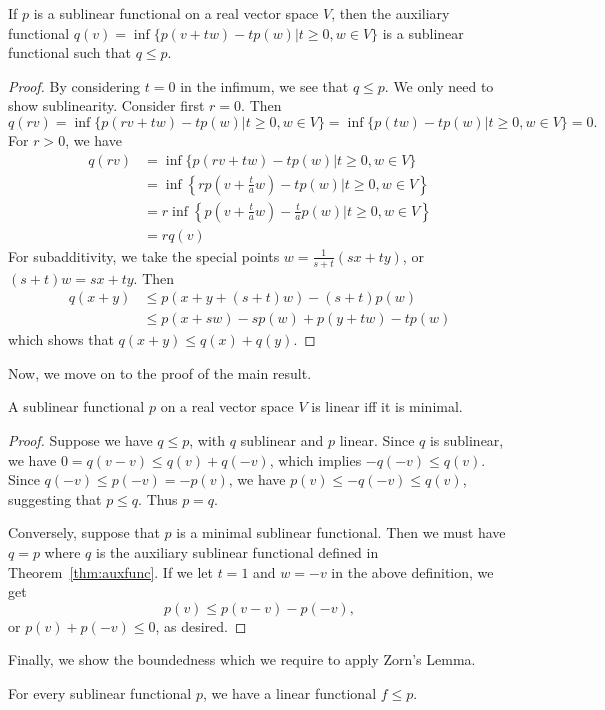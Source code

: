 \documentclass[twoside,symmetric, openany, 12pt]{./tuftebook}
\theoremstyle{definition}
\theoremstyle{definition}
\theoremstyle{definition}
\begin{document}
\begin{Theorem}\label{thm:auxfunc}
	If $p$ is a sublinear functional on a real vector space $V$, then the auxiliary functional $q(v)=\inf \{p(v+tw)-tp(w)|t\ge 0,w\in V\} $ is a sublinear functional such that $q \le p$.
\end{Theorem}
\begin{proof}
	By considering $t=0$ in the infimum, we see that $q\le p$. We only need to show sublinearity. Consider first $r=0$. Then
	\[
	q(rv)=\inf \{p(rv+tw)-tp(w)|t\ge 0,w\in V\} =\inf \{p(tw)-tp(w)|t\ge 0, w\in V\} =0
	.\] 
	For $r>0$, we have
	\begin{align*}
		q(rv)&=\inf \{p(rv+tw)-tp(w)|t \ge 0, w\in V\} \\
		     &=\inf \left\{ rp\left( v+\frac{t}{a}w \right)-tp(w)|t\ge 0, w\in V \right\} \\
		     &=r\inf \left\{p\left(v+\frac ta w\right) -\frac ta p(w)|t\ge 0, w\in V\right\} \\
		     &=rq(v)
	\end{align*}
	For subadditivity, we take the special points $w=\frac{1}{s+t}(sx+ty)$, or $(s+t)w=sx+ty$. Then
	\begin{align*}
		q(x+y)&\le p(x+y+(s+t)w)-(s+t)p(w)\\
		      &\le p(x+sw)-sp(w)+p(y+tw)-tp(w)
	\end{align*}
	which shows that $q(x+y)\le q(x)+q(y)$.
\end{proof}
Now, we move on to the proof of the main result.
\begin{Theorem}
	A sublinear functional $p$ on a real vector space $V$ is linear iff it is minimal.
\end{Theorem}
\begin{proof}
	Suppose we have $q\le p$, with $q$ sublinear and $p$ linear. Since $q$ is sublinear, we have $0=q(v-v)\le q(v)+q(-v)$, which implies $-q(-v)\le q(v)$. Since $q(-v) \le p(-v)=-p(v)$, we have $p(v)\le -q(-v)\le q(v)$, suggesting that $p\le q$. Thus $p=q$.

	Conversely, suppose that $p$ is a minimal sublinear functional. Then we must have $q=p$ where $q$ is the auxiliary sublinear functional defined in Theorem~\ref{thm:auxfunc}. If we let $t=1$ and $w=-v$ in the above definition, we get
	\[
	p(v)\le p(v-v)-p(-v)
,\]
or $p(v)+p(-v)\le 0$, as desired. 
\end{proof}
Finally, we show the boundedness which we require to apply Zorn's Lemma.
\begin{Theorem}
	For every sublinear functional $p$, we have a linear functional $f\le p$. 
\end{Theorem}
\end{document}
